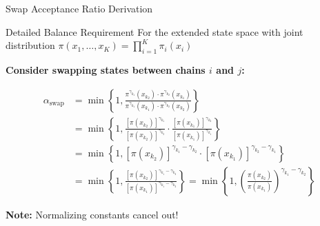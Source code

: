 \documentclass[aspectratio=169]{beamer}
\begin{document}
\begin{frame}{Swap Acceptance Ratio Derivation}
\begin{block}{Detailed Balance Requirement}
For the extended state space with joint distribution $\pi(x_1, \ldots, x_K) = \prod_{i=1}^K \pi_i(x_i)$
\end{block}

\textbf{Consider swapping states between chains $i$ and $j$:}

\begin{align*}
\alpha_{\text{swap}} &= \min\left\{1, \frac{\pi^{\gamma_{k_1}}(x_{k_2}) \cdot \pi^{\gamma_{k_2}}(x_{k_1})}{\pi^{\gamma_{k_1}}(x_{k_1}) \cdot \pi^{\gamma_{k_2}}(x_{k_2})}\right\}\\
&= \min\left\{1, \frac{[\pi(x_{k_2})]^{\gamma_{k_1}}}{[\pi(x_{k_2})]^{\gamma_{k_2}}} \cdot \frac{[\pi(x_{k_1})]^{\gamma_{k_2}}}{[\pi(x_{k_1})]^{\gamma_{k_1}}}\right\} \\
&= \min\left\{1, [\pi(x_{k_2})]^{\gamma_{k_1} - \gamma_{k_2}} \cdot [\pi(x_{k_1})]^{\gamma_{k_2} - \gamma_{k_1}}\right\} \\
&= \min\left\{1, \frac{[\pi(x_{k_2})]^{\gamma_{k_1} - \gamma_{k_2}}}{[\pi(x_{k_1})]^{\gamma_{k_1} - \gamma_{k_2}}}\right\} 
= \min\left\{1, \left(\frac{\pi(x_{k_2})}{\pi(x_{k_1})}\right) ^{\gamma_{k_1} - \gamma_{k_2}}    \right\}
\end{align*}



\textcolor{copenhagenred}{\textbf{Note:}} Normalizing constants cancel out!
\end{frame}
\end{document}
